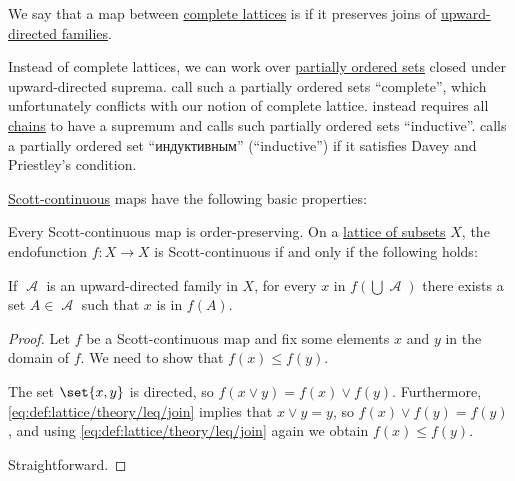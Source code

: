 \begin{definition}\label{def:scott_continuity}
  We say that a map between \hyperref[def:complete_lattice]{complete lattices} is  if it preserves joins of \hyperref[def:directed_set]{upward-directed families}.
\end{definition}
\begin{comments}
  \item Instead of complete lattices, we can work over \hyperref[def:partially_ordered_set]{partially ordered sets} closed under upward-directed suprema. \Textcite[def. 8.1]{DaveyPriestley2002LatticeTheory} call such a partially ordered sets \enquote{complete}, which unfortunately conflicts with our notion of complete lattice. \Textcite[192]{Birkhoff1967LatticeTheory} instead requires all \hyperref[def:partial_order_connectedness]{chains} to have a supremum and calls such partially ordered sets \enquote{inductive}. \Textcite[83]{БелоусовТкачёв2004ДискретнаяМатематика} calls a partially ordered set \enquote{индуктивным} (\enquote{inductive}) if it satisfies Davey and Priestley's condition.
\end{comments}

\begin{proposition}\label{thm:def:scott_continuity}
  \hyperref[def:scott_continuity]{Scott-continuous} maps have the following basic properties:
  \begin{thmenum}
     Every Scott-continuous map is order-preserving.
     On a \hyperref[def:power_set_algebra]{lattice of subsets} \( X \), the endofunction \( f: X \to X \) is Scott-continuous if and only if the following holds:
    \begin{displayquote}
      If \( \mscrA \) is an upward-directed family in \( X \), for every \( x \) in \( f(\bigcup \mscrA) \) there exists a set \( A \in \mscrA \) such that \( x \) is in \( f(A) \).
    \end{displayquote}
  \end{thmenum}
\end{proposition}
\begin{proof}
   Let \( f \) be a Scott-continuous map and fix some elements \( x \) and \( y \) in the domain of \( f \). We need to show that \( f(x) \leq f(y) \).

  The set \( \set{ x, y } \) is directed, so \( f(x \vee y) = f(x) \vee f(y) \). Furthermore, \eqref{eq:def:lattice/theory/leq/join} implies that \( x \vee y = y \), so \( f(x) \vee f(y) = f(y) \), and using \eqref{eq:def:lattice/theory/leq/join} again we obtain \( f(x) \leq f(y) \).

   Straightforward.
\end{proof}

